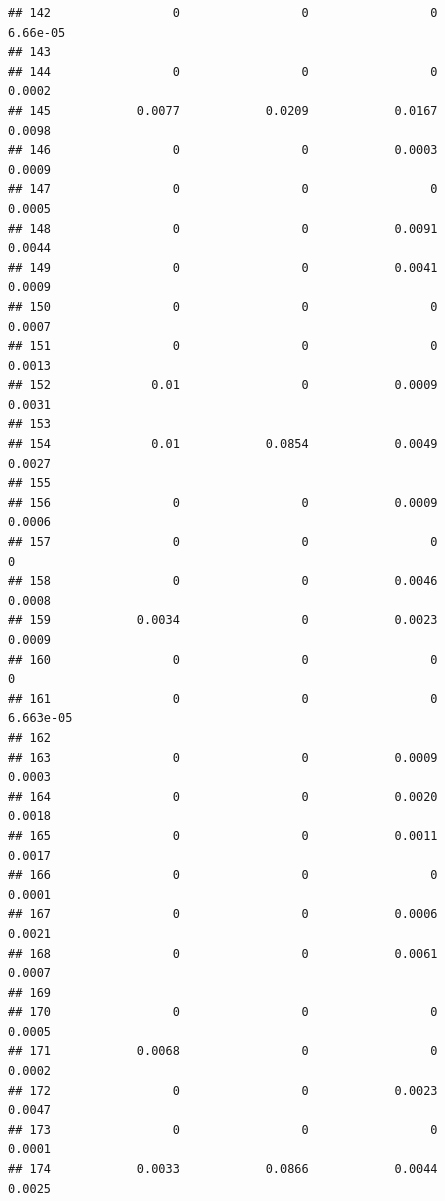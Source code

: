 \documentclass[
]{article}
\begin{document}
\begin{verbatim}
## 142                 0                 0                 0          6.66e-05
## 143                                                                        
## 144                 0                 0                 0            0.0002
## 145            0.0077            0.0209            0.0167            0.0098
## 146                 0                 0            0.0003            0.0009
## 147                 0                 0                 0            0.0005
## 148                 0                 0            0.0091            0.0044
## 149                 0                 0            0.0041            0.0009
## 150                 0                 0                 0            0.0007
## 151                 0                 0                 0            0.0013
## 152              0.01                 0            0.0009            0.0031
## 153                                                                        
## 154              0.01            0.0854            0.0049            0.0027
## 155                                                                        
## 156                 0                 0            0.0009            0.0006
## 157                 0                 0                 0                 0
## 158                 0                 0            0.0046            0.0008
## 159            0.0034                 0            0.0023            0.0009
## 160                 0                 0                 0                 0
## 161                 0                 0                 0         6.663e-05
## 162                                                                        
## 163                 0                 0            0.0009            0.0003
## 164                 0                 0            0.0020            0.0018
## 165                 0                 0            0.0011            0.0017
## 166                 0                 0                 0            0.0001
## 167                 0                 0            0.0006            0.0021
## 168                 0                 0            0.0061            0.0007
## 169                                                                        
## 170                 0                 0                 0            0.0005
## 171            0.0068                 0                 0            0.0002
## 172                 0                 0            0.0023            0.0047
## 173                 0                 0                 0            0.0001
## 174            0.0033            0.0866            0.0044            0.0025

\end{verbatim}
\end{document}
